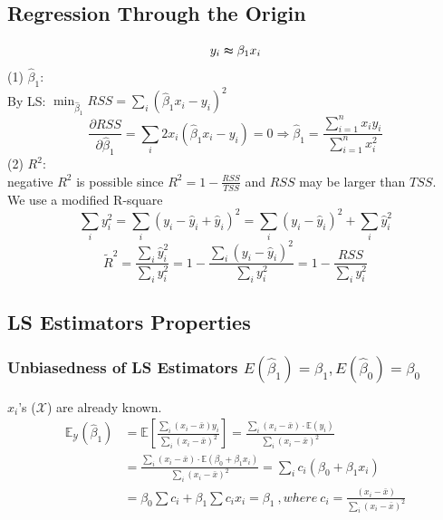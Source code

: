 \documentclass[11pt,a4paper]{article}
\begin{document}
\subsection{Regression Through the Origin}
$$y_i\thickapprox \beta_1 x_i$$
(1) $\hat{\beta}_1$:\\
By LS: $\min_{\hat{\beta}_1} RSS=\sum_i(\hat{\beta}_1x_i-y_i)^2$
$$\frac{\partial RSS}{\partial \hat{\beta}_1}=\sum_i2x_i(\hat{\beta}_1x_i-y_i)=0 \Rightarrow \hat{\beta}_1=\frac{\sum_{i=1}^{n}x_{i}y_{i}}{\sum_{i=1}^{n}x_{i}^{2}}$$
(2) $R^2$:\\
negative $R^2$ is possible since $R^2=1-\frac{RSS}{TSS}$ and $RSS$ may be larger than $TSS$.\\
We use a modified R-square\\
$$\sum_iy_i^2=\sum_i(y_i-\hat{y}_i+\hat{y}_i)^2=\sum_i(y_i-\hat{y}_i)^2+\sum_i \hat{y}_i^2$$
$$\tilde{R}^2=\frac{\sum_i \hat{y}_i^2}{\sum_iy_i^2}=1-\frac{\sum_i(y_i-\hat{y}_i)^2}{\sum_iy_i^2}=1-\frac{RSS}{\sum_iy_i^2}$$

\subsection{LS Estimators Properties}
\subsubsection{Unbiasedness of LS Estimators $E(\hat{\beta}_1)=\beta_1, E(\hat{\beta}_0)=\beta_0$}
$x_i$'s ($\mathcal{X}$) are already known.
\begin{equation}
    \begin{aligned}
        \mathbb{E}_{\mathcal{Y}}\left(\hat{\beta}_{1}\right) &=\mathbb{E}\left[\frac{\sum_{i}\left(x_{i}-\bar{x}\right) y_{i}}{\sum_{i}\left(x_{i}-\bar{x}\right)^{2}}\right]=\frac{\sum_{i}\left(x_{i}-\bar{x}\right) \cdot \mathbb{E}\left(y_{i}\right)}{\sum_{i}\left(x_{i}-\bar{x}\right)^{2}} \\
        &=\frac{\sum_{i}\left(x_{i}-\bar{x}\right) \cdot \mathbb{E}\left(\beta_{0}+\beta_{1} x_{i}\right)}{\sum_{i}\left(x_{i}-\bar{x}\right)^{2}}=\sum_{i} c_{i}\left(\beta_{0}+\beta_{1} x_{i}\right) \\
        &=\beta_{0} \sum c_{i}+\beta_{1} \sum c_{i} x_{i}=\beta_{1}\ ,where\ c_i=\frac{\left(x_{i}-\bar{x}\right)}{\sum_{i}\left(x_{i}-\bar{x}\right)^2}
        \end{aligned}
    \nonumber
\end{equation}
\end{document}
